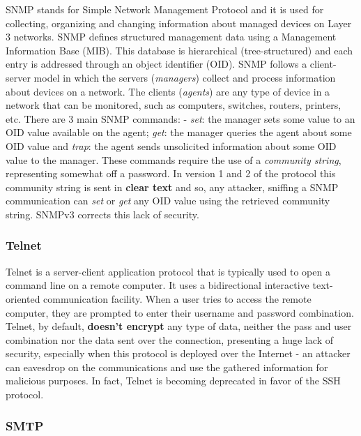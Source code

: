 SNMP stands for Simple Network Management Protocol and it is used for collecting, organizing and changing information about managed devices on Layer 3 networks. 
SNMP defines structured management data using a Management Information Base (MIB). 
This database is hierarchical (tree-structured) and each entry is addressed through an object identifier (OID). 
SNMP follows a client-server model in which the servers (\textit{managers}) collect and process information about devices on a network. 
The clients (\textit{agents}) are any type of device in a network that can be monitored, such as computers, switches, routers, printers, etc. 
There are 3 main SNMP commands: - \textit{set}: the manager sets some value to an OID value available on the agent; \textit{get}: the manager queries the agent about some OID value and \textit{trap}: the agent sends unsolicited information about some OID value to the manager. 
These commands require the use of a \textit{community string}, representing somewhat off a password. 
In version 1 and 2 of the protocol this community string is sent in \textbf{clear text} and so, any attacker, sniffing a SNMP communication can \textit{set} or \textit{get} any OID value using the retrieved community string. 
SNMPv3 corrects this lack of security. 

\subsubsection{Telnet}

Telnet is a server-client application protocol that is typically used to open a command line on a remote computer. 
It uses a bidirectional interactive text-oriented communication facility. 
When a user tries to access the remote computer, they are prompted to enter their username and password combination. 
Telnet, by default, \textbf{doesn't encrypt} any type of data, neither the pass and user combination nor the data sent over the connection, presenting a huge lack of security, especially when this protocol is deployed over the Internet - an attacker can  eavesdrop on the communications and use the gathered information for malicious purposes. 
In fact, Telnet is becoming deprecated in favor of the SSH protocol.


\subsubsection{SMTP}

